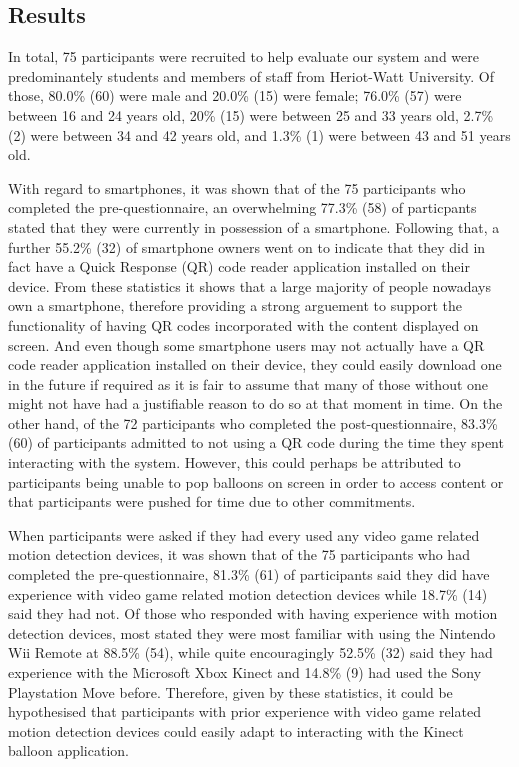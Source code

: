 \subsection{Results}

In total, 75 participants were recruited to help evaluate our system and were predominantely students and members of staff from Heriot-Watt University. Of those, 80.0\% (60) were male and 20.0\% (15) were female; 76.0\% (57) were between 16 and 24 years old, 20\% (15) were between 25 and 33 years old, 2.7\% (2) were between 34 and 42 years old, and 1.3\% (1) were between 43 and 51 years old.

With regard to smartphones, it was shown that of the 75 participants who completed the pre-questionnaire, an overwhelming 77.3\% (58) of particpants stated that they were currently in possession of a smartphone. Following that, a further 55.2\% (32) of smartphone owners went on to indicate that they did in fact have a Quick Response (QR) code reader application installed on their device. From these statistics it shows that a large majority of people nowadays own a smartphone, therefore providing a strong arguement to support the functionality of having QR codes incorporated with the content displayed on screen. And even though some smartphone users may not actually have a QR code reader application installed on their device, they could easily download one in the future if required as it is fair to assume that many of those without one might not have had a justifiable reason to do so at that moment in time.
On the other hand, of the 72 participants who completed the post-questionnaire, 83.3\% (60) of participants admitted to not using a QR code during the time they spent interacting with the system. However, this could perhaps be attributed to participants being unable to pop balloons on screen in order to access content or that participants were pushed for time due to other commitments.

When participants were asked if they had every used any video game related motion detection devices, it was shown that of the 75 participants who had completed the pre-questionnaire, 81.3\% (61) of participants said they did have experience with video game related motion detection devices while 18.7\% (14) said they had not. Of those who responded with having experience with motion detection devices, most stated they were most familiar with using the Nintendo Wii Remote at 88.5\% (54), while quite encouragingly 52.5\% (32) said they had experience with the Microsoft Xbox Kinect and 14.8\% (9) had used the Sony Playstation Move before. Therefore, given by these statistics, it could be hypothesised that participants with prior experience with video game related motion detection devices could easily adapt to interacting with the Kinect balloon application.

